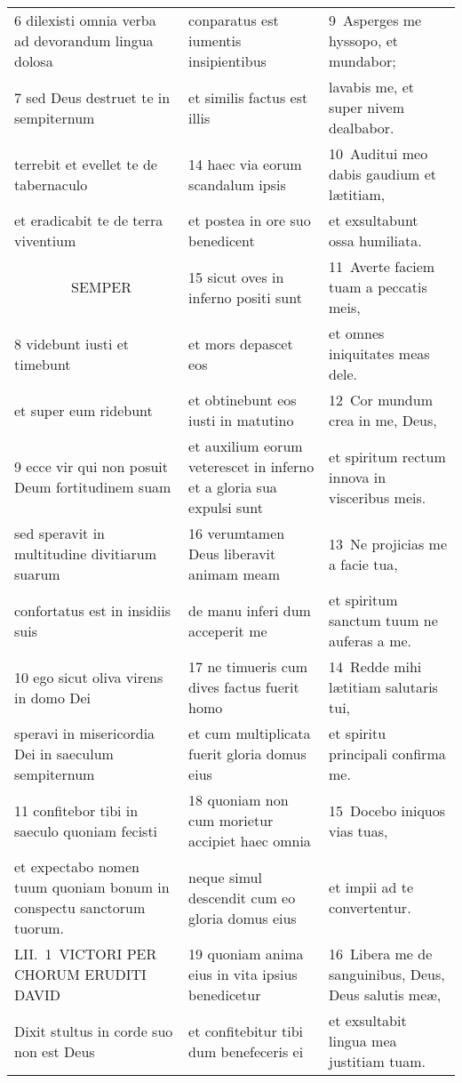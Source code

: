 \documentclass{article}
\begin{document}
\begin{longtable}{@{}p{}p{}p{}@{}}
6 dilexisti omnia verba ad devorandum lingua dolosa	&	conparatus est iumentis insipientibus	&	9 Asperges me hyssopo, et mundabor;	\\
7 sed Deus destruet te in sempiternum	&	et similis factus est illis	&	lavabis me, et super nivem dealbabor.	\\
terrebit et evellet te de tabernaculo	&	14 haec via eorum scandalum ipsis	&	10 Auditui meo dabis gaudium et lætitiam,	\\
et eradicabit te de terra viventium	&	et postea in ore suo benedicent	&	et exsultabunt ossa humiliata.	\\
    SEMPER	&	15 sicut oves in inferno positi sunt	&	11 Averte faciem tuam a peccatis meis,	\\
8 videbunt iusti et timebunt	&	et mors depascet eos	&	et omnes iniquitates meas dele.	\\
et super eum ridebunt	&	et obtinebunt eos iusti in matutino	&	12 Cor mundum crea in me, Deus,	\\
9 ecce vir qui non posuit Deum fortitudinem suam	&	et auxilium eorum veterescet in inferno et a gloria sua expulsi sunt	&	et spiritum rectum innova in visceribus meis.	\\
sed speravit in multitudine divitiarum suarum	&	16 verumtamen Deus liberavit animam meam	&	13 Ne projicias me a facie tua,	\\
confortatus est in insidiis suis	&	de manu inferi dum acceperit me	&	et spiritum sanctum tuum ne auferas a me.	\\
10 ego sicut oliva virens in domo Dei	&	17 ne timueris cum dives factus fuerit homo	&	14 Redde mihi lætitiam salutaris tui,	\\
speravi in misericordia Dei in saeculum sempiternum	&	et cum multiplicata fuerit gloria domus eius	&	et spiritu principali confirma me.	\\
11 confitebor tibi in saeculo quoniam fecisti	&	18 quoniam non cum morietur accipiet haec omnia	&	15 Docebo iniquos vias tuas,	\\
et expectabo nomen tuum quoniam bonum in conspectu sanctorum tuorum.	&	neque simul descendit cum eo gloria domus eius	&	et impii ad te convertentur.	\\
LII. 1 VICTORI PER CHORUM ERUDITI DAVID	&	19 quoniam anima eius in vita ipsius benedicetur	&	16 Libera me de sanguinibus, Deus, Deus salutis meæ,	\\
Dixit stultus in corde suo non est Deus	&	et confitebitur tibi dum benefeceris ei	&	et exsultabit lingua mea justitiam tuam.	\\

\end{longtable}
\end{document}
